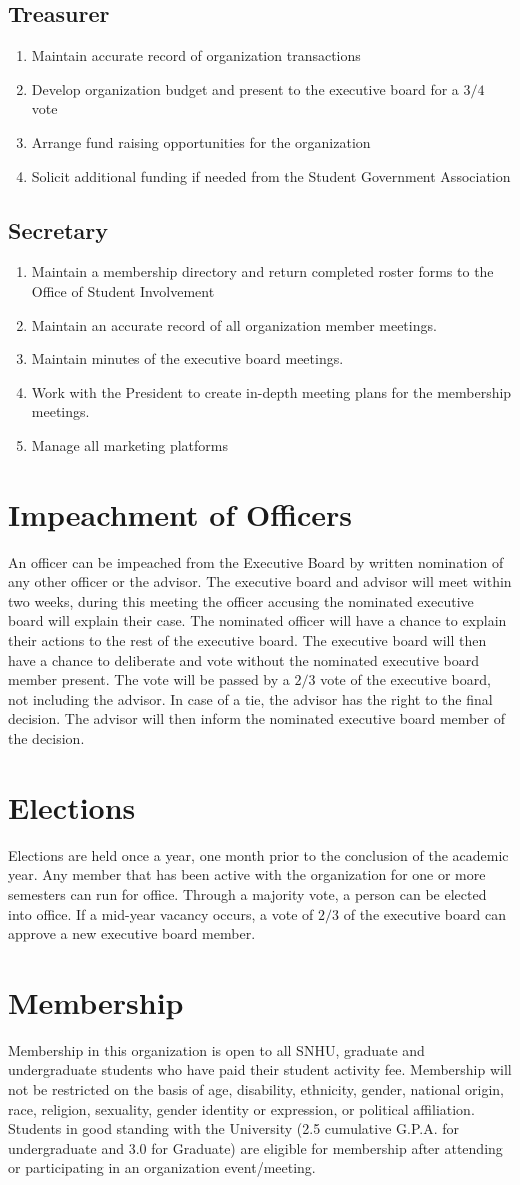 \documentclass{article}
\newcommand{\article}[1]{\section{#1} \label{#1}}
\newcommand{\asection}[1]{\subsection{#1} \label{#1}}
\begin{document}
\asection{Treasurer}
\begin{enumerate}
\item Maintain accurate record of organization transactions
\item Develop organization budget and present to the executive board for a $3/4$ vote
\item Arrange fund raising opportunities for the organization
\item Solicit additional funding if needed from the Student Government Association
\end{enumerate}

\asection {Secretary}
\begin{enumerate}
\item Maintain a membership directory and return completed roster forms to the Office of Student Involvement
\item Maintain an accurate record of all organization member meetings.
\item Maintain minutes of the executive board meetings.
\item Work with the President to create in-depth meeting plans for the membership meetings.
\item Manage all marketing platforms
\end{enumerate}

\article{Impeachment of Officers}
An officer can be impeached from the Executive Board by written nomination of any other officer or the advisor. The executive board and advisor will meet within two weeks, during this meeting the officer accusing the nominated executive board will explain their case. The nominated officer will have a chance to explain their actions to the rest of the executive board. The executive board will then have a chance to deliberate and vote without the nominated executive board member present. The vote will be passed by a $2/3$ vote of the executive board, not including the advisor. In case of a tie, the advisor has the right to the final decision. The advisor will then inform the nominated executive board member of the decision.

\article{Elections}
Elections are held once a year, one month prior to the conclusion of the academic year. Any member that has been active with the organization for one or more semesters can run for office. Through a majority vote, a person can be elected into office. If a mid-year vacancy occurs, a vote of $2/3$ of the executive board can approve a new executive board member.

\article{Membership}
Membership in this organization is open to all SNHU, graduate and undergraduate students who have paid their student activity fee. Membership will not be restricted on the basis of age, disability, ethnicity, gender, national origin, race, religion, sexuality, gender identity or expression, or political affiliation. Students in good standing with the University (2.5 cumulative  G.P.A. for undergraduate and 3.0 for Graduate) are eligible for membership after attending or participating in an organization event/meeting.
\end{document}
